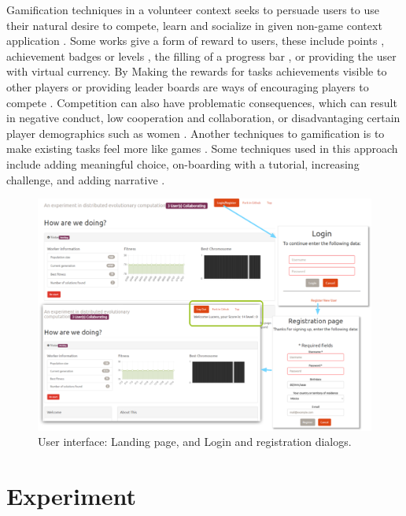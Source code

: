 \documentclass{llncs}
\begin{document}
Gamification techniques in a volunteer context seeks to persuade 
users to use their natural desire to compete, learn and socialize in 
given non-game context application \cite{deterding2011game,hamari2014does}.  
Some works give a form of reward to users, these include 
points \cite{sutter2010browse}, achievement badges or levels \cite{hamari2011framework}, 
the filling of a progress bar \cite{o2010get}, or providing the user with virtual currency.
By Making the rewards for  tasks achievements visible to other players or 
providing leader boards are ways of encouraging players to compete \cite{hickman2010total}. 
Competition can also have problematic consequences, which can result in
negative conduct, low cooperation and collaboration, or disadvantaging certain player demographics
such as women \cite{kumar2013gamification}. Another techniques to gamification 
is to make existing tasks feel more like games \cite{deterding2010just}. 
Some techniques used in this approach include adding meaningful choice, 
on-boarding with a tutorial, increasing challenge, and adding narrative \cite{mcgonigal2011reality}.

\begin{figure}[htbp]
    \centering
        \includegraphics[width=5in]{img/login.png}
    \caption{ User interface: Landing page, and Login and registration dialogs.  
    }
    \label{fig:login}
\end{figure}

\section{Experiment}
\label{sec:experiments}
\end{document}
